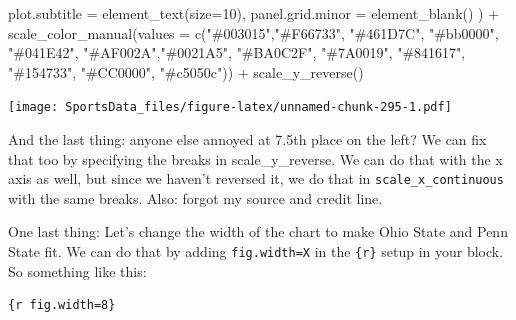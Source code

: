 \documentclass[
]{book}
\newenvironment{Shaded}{\begin{snugshade}}{\end{snugshade}}
\newcommand{\AttributeTok}[1]{\textcolor[rgb]{0.77,0.63,0.00}{#1}}
\newcommand{\DecValTok}[1]{\textcolor[rgb]{0.00,0.00,0.81}{#1}}
\newcommand{\FunctionTok}[1]{\textcolor[rgb]{0.00,0.00,0.00}{#1}}
\newcommand{\NormalTok}[1]{#1}
\newcommand{\SpecialCharTok}[1]{\textcolor[rgb]{0.00,0.00,0.00}{#1}}
\newcommand{\StringTok}[1]{\textcolor[rgb]{0.31,0.60,0.02}{#1}}
\begin{document}
\begin{Shaded}
\begin{Highlighting}[]
    \AttributeTok{plot.subtitle =} \FunctionTok{element\_text}\NormalTok{(}\AttributeTok{size=}\DecValTok{10}\NormalTok{), }
    \AttributeTok{panel.grid.minor =} \FunctionTok{element\_blank}\NormalTok{()}
\NormalTok{    ) }\SpecialCharTok{+}
  \FunctionTok{scale\_color\_manual}\NormalTok{(}\AttributeTok{values =} \FunctionTok{c}\NormalTok{(}\StringTok{"\#003015"}\NormalTok{,}\StringTok{"\#F66733"}\NormalTok{, }\StringTok{"\#461D7C"}\NormalTok{, }\StringTok{"\#bb0000"}\NormalTok{, }\StringTok{"\#041E42"}\NormalTok{, }\StringTok{"\#AF002A"}\NormalTok{,}\StringTok{"\#0021A5"}\NormalTok{, }\StringTok{"\#BA0C2F"}\NormalTok{, }\StringTok{"\#7A0019"}\NormalTok{, }\StringTok{"\#841617"}\NormalTok{, }\StringTok{"\#154733"}\NormalTok{, }\StringTok{"\#CC0000"}\NormalTok{, }\StringTok{"\#c5050c"}\NormalTok{)) }\SpecialCharTok{+}
  \FunctionTok{scale\_y\_reverse}\NormalTok{() }
\end{Highlighting}
\end{Shaded}

\texttt{[image: SportsData\_files/figure-latex/unnamed-chunk-295-1.pdf]}

And the last thing: anyone else annoyed at 7.5th place on the left? We can fix that too by specifying the breaks in scale\_y\_reverse. We can do that with the x axis as well, but since we haven't reversed it, we do that in \texttt{scale\_x\_continuous} with the same breaks. Also: forgot my source and credit line.

One last thing: Let's change the width of the chart to make Ohio State and Penn State fit. We can do that by adding \texttt{fig.width=X} in the \texttt{\{r\}} setup in your block. So something like this:

\begin{verbatim}
{r fig.width=8}
\end{verbatim}
\end{document}
